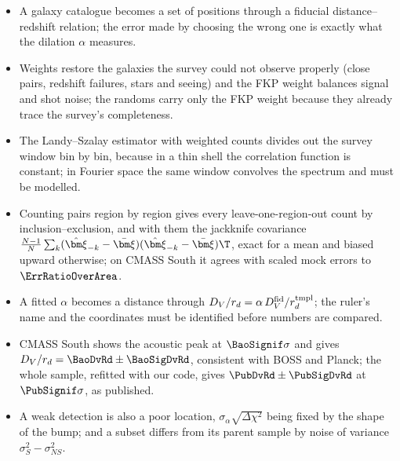 \begin{recap}
\begin{itemize}[itemsep=1pt,leftmargin=1.2em]
  \item A galaxy catalogue becomes a set of positions through a fiducial
        distance--redshift relation; the error made by choosing the wrong one is
        exactly what the dilation $\alpha$ measures.
  \item Weights restore the galaxies the survey could not observe properly (close
        pairs, redshift failures, stars and seeing) and the FKP weight balances
        signal and shot noise; the randoms carry only the FKP weight because they
        already trace the survey's completeness.
  \item The Landy--Szalay estimator with weighted counts divides out the survey window
        bin by bin, because in a thin shell the correlation function is constant; in
        Fourier space the same window convolves the spectrum and must be modelled.
  \item Counting pairs region by region gives every leave-one-region-out count by
        inclusion--exclusion, and with them the jackknife covariance
        $\frac{N-1}{N}\sum_k(\hat{\bm\xi}_{-k}-\bar{\bm\xi})(\hat{\bm\xi}_{-k}-\bar{\bm\xi})\T$,
        exact for a mean and biased upward otherwise; on CMASS South it agrees with
        scaled mock errors to $\ErrRatioOverArea$.
  \item A fitted $\alpha$ becomes a distance through
        $D_V/r_d=\alpha\,D_V^{\rm fid}/r_d^{\rm tmpl}$; the ruler's name and the
        coordinates must be identified before numbers are compared.
  \item CMASS South shows the acoustic peak at $\BaoSignif\sigma$ and gives
        $D_V/r_d=\BaoDvRd\pm\BaoSigDvRd$, consistent with BOSS and Planck; the whole
        sample, refitted with our code, gives $\PubDvRd\pm\PubSigDvRd$ at
        $\PubSignif\sigma$, as published.
  \item A weak detection is also a poor location, $\sigma_\alpha\sqrt{\Delta\chi^2}$
        being fixed by the shape of the bump; and a subset differs from its parent
        sample by noise of variance $\sigma_S^2-\sigma_{NS}^2$.
\end{itemize}
\end{recap}
\providecommand{\FourBScPgvFive}{}\renewcommand{\FourBScPgvFive}{1.36\times10^{-5}}
\providecommand{\FourBScZgvFive}{}\renewcommand{\FourBScZgvFive}{4.20}
\providecommand{\FourBScPlocFive}{}\renewcommand{\FourBScPlocFive}{2.87\times10^{-7}}
